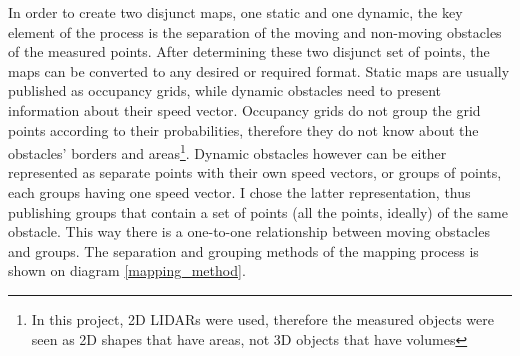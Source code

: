 In order to create two disjunct maps, one static and one dynamic, the key element of the process is the separation of the moving and non-moving obstacles of the measured points. After determining these two disjunct set of points, the maps can be converted to any desired or required format. Static maps are usually published as occupancy grids, while dynamic obstacles need to present information about their speed vector. Occupancy grids do not group the grid points according to their probabilities, therefore they do not know about the obstacles' borders and areas\footnote{In this project, 2D LIDARs were used, therefore the measured objects were seen as 2D shapes that have areas, not 3D objects that have volumes}. Dynamic obstacles however can be either represented as separate points with their own speed vectors, or groups of points, each groups having one speed vector. I chose the latter representation, thus publishing groups that contain a set of points (all the points, ideally) of the same obstacle. This way there is a one-to-one relationship between moving obstacles and groups. The separation and grouping methods of the mapping process is shown on diagram \ref{mapping_method}.


